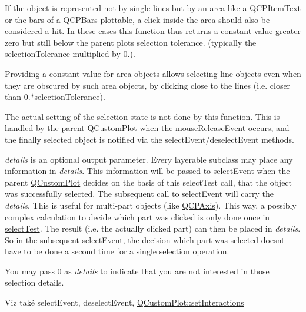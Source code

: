 If the object is represented not by single lines but by an area like a \hyperlink{classQCPItemText}{Q\+C\+P\+Item\+Text} or the bars of a \hyperlink{classQCPBars}{Q\+C\+P\+Bars} plottable, a click inside the area should also be considered a hit. In these cases this function thus returns a constant value greater zero but still below the parent plot\textquotesingle{}s selection tolerance. (typically the selection\+Tolerance multiplied by 0.).

Providing a constant value for area objects allows selecting line objects even when they are obscured by such area objects, by clicking close to the lines (i.\+e. closer than 0.$\ast$selection\+Tolerance).

The actual setting of the selection state is not done by this function. This is handled by the parent \hyperlink{classQCustomPlot}{Q\+Custom\+Plot} when the mouse\+Release\+Event occurs, and the finally selected object is notified via the select\+Event/deselect\+Event methods.

{\itshape details} is an optional output parameter. Every layerable subclass may place any information in {\itshape details}. This information will be passed to select\+Event when the parent \hyperlink{classQCustomPlot}{Q\+Custom\+Plot} decides on the basis of this select\+Test call, that the object was successfully selected. The subsequent call to select\+Event will carry the {\itshape details}. This is useful for multi-\/part objects (like \hyperlink{classQCPAxis}{Q\+C\+P\+Axis}). This way, a possibly complex calculation to decide which part was clicked is only done once in \hyperlink{classQCPLayerable_a4001c4d0dfec55598efa4d531f2179a9}{select\+Test}. The result (i.\+e. the actually clicked part) can then be placed in {\itshape details}. So in the subsequent select\+Event, the decision which part was selected doesn\textquotesingle{}t have to be done a second time for a single selection operation.

You may pass 0 as {\itshape details} to indicate that you are not interested in those selection details.

\begin{DoxySeeAlso}{Viz také}
select\+Event, deselect\+Event, \hyperlink{classQCustomPlot_a5ee1e2f6ae27419deca53e75907c27e5}{Q\+Custom\+Plot\+::set\+Interactions} 
\end{DoxySeeAlso}


